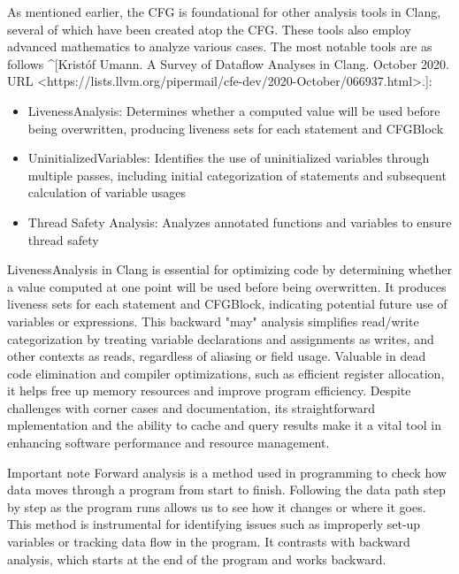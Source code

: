 \begin{markdown}
As mentioned earlier, the CFG is foundational for other analysis tools in Clang, several of which have been created atop the CFG. These tools also employ advanced mathematics to analyze various cases. The most notable tools are as follows ^[Kristóf Umann. A Survey of Dataflow Analyses in Clang. October 2020. URL <https://lists.llvm.org/pipermail/cfe-dev/2020-October/066937.html>.]:
\end{markdown}

\begin{itemize}
\item
LivenessAnalysis: Determines whether a computed value will be used before being overwritten, producing liveness sets for each statement and CFGBlock

\item
UninitializedVariables: Identifies the use of uninitialized variables through multiple passes, including initial categorization of statements and subsequent calculation of variable usages

\item
Thread Safety Analysis: Analyzes annotated functions and variables to ensure thread safety
\end{itemize}

LivenessAnalysis in Clang is essential for optimizing code by determining whether a value computed at one point will be used before being overwritten. It produces liveness sets for each statement and CFGBlock, indicating potential future use of variables or expressions. This backward "may" analysis simplifies read/write categorization by treating variable declarations and assignments as writes, and other contexts as reads, regardless of aliasing or field usage. Valuable in dead code elimination and compiler optimizations, such as efficient register allocation, it helps free up memory resources and improve program efficiency. Despite challenges with corner cases and documentation, its straightforward mplementation and the ability to cache and query results make it a vital tool in enhancing software performance and resource management.

\begin{myNotic}{Important note}
Forward analysis is a method used in programming to check how data moves through a program from start to finish. Following the data path step by step as the program runs allows us to see how it changes or where it goes. This method is instrumental for identifying issues such as improperly set-up variables or tracking data flow in the program. It contrasts with backward analysis, which starts at the end of the program and works backward.
\end{myNotic}

